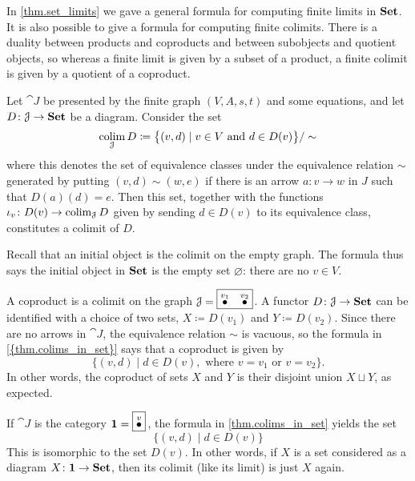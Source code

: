 \documentclass[7Sketches]{subfiles}
\begin{document}
In \cref{thm.set_limits} we gave a general formula for computing finite limits
in $\mathbf{Set}$. It is also possible to give a formula for computing finite colimits. There is a duality between products and coproducts and between subobjects and quotient objects, so whereas a finite limit is given by a subset of a product, a finite colimit is given by a quotient of a coproduct.%
%

\begin{theorem}%
\label{thm.colims_in_set}%
Let $\cat{J}$ be presented by the finite graph $(V,A,s,t)$ and some equations, and let $D\colon \mathcal{J} \to \mathbf{Set}$ be a diagram. Consider the set
\[\operatorname*{colim}_{\mathcal{J}} D \coloneqq \big\{(v,d)\mid v\in V \text{ and }d\in D(v)\big\}/\sim\]
where this denotes the set of equivalence classes under the equivalence relation
$\sim$ generated by putting $(v,d)\sim (w,e)$ if there is an arrow $a\colon v\to w$ in $J$ such that $D(a)(d)=e$. Then this set, together with the functions $\iota_v\colon D(v)\to\operatorname*{colim}_{\mathcal{J}} D$ given by sending $d\in D(v)$ to its equivalence class, constitutes a colimit of $D$.%
\end{theorem}

\begin{example} %
\label{ex.initial_obj}
   Recall that an initial object is the colimit on the empty graph. The formula thus says
   the initial object in $\mathbf{Set}$ is the empty set $\varnothing$: there are no $v
   \in V$.
\end{example}

\begin{example} %
\label{ex.coproduct}
A coproduct is a colimit on the graph $\cat{J}=\fbox{$\LMO{v_1}\quad\LMO{v_2}$}$. A functor $D\colon\mathcal{J}\to\mathbf{Set}$ can be identified with a choice of two sets, $X\coloneqq D(v_1)$ and $Y\coloneqq D(v_2)$. Since there are no arrows in $\cat{J}$, the equivalence relation $\sim$ is vacuous, so the
formula in \cref{{thm.colims_in_set}} says that a coproduct is given by
\[\{(v,d) \mid d \in D(v), \text{ where } v=v_1 \text{ or }v=v_2\}.\]
In other words, the coproduct of sets $X$ and $Y$ is their disjoint
union $X \sqcup Y$, as expected.
\end{example}

\begin{example}
If $\cat{J}$ is the category $\Cat{1} = \fbox{$\LMO{v}$}\,$, the formula in \cref{thm.colims_in_set}
yields the set
  \[\{(v,d) \mid d \in D(v)\}\]
This is isomorphic to the set $D(v)$. In other words, if $X$ is a set considered
as a diagram $X \colon \mathbf{1} \to \mathbf{Set}$, then its colimit (like its limit)
is just $X$ again.
\end{example}
\end{document}
